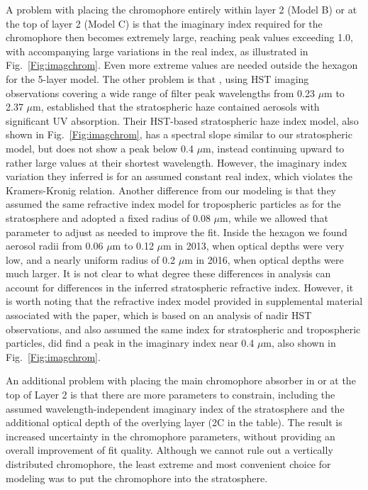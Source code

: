\documentclass[article,11pt]{emulateapj}
\def\mum{$\mu$m }
\def\mumx{$\mu$m}
\begin{document}
A problem with placing the chromophore entirely within layer 2 (Model B) or at the top of
layer 2 (Model C) is that the imaginary index required for the chromophore then becomes extremely large,
reaching peak values exceeding 1.0, with accompanying large variations in the real
index, as illustrated in Fig.\ \ref{Fig:imagchrom}. Even more extreme values are
needed outside the hexagon for the 5-layer model.  The other problem is that \cite{Kark2005}, using
HST imaging observations covering a wide range of filter peak wavelengths from 0.23 \mum to 2.37 \mumx, 
established that the 
stratospheric haze contained aerosols with significant UV absorption. Their HST-based
stratospheric haze index model, also shown in Fig.\ \ref{Fig:imagchrom}, has a
spectral slope similar to our stratospheric model, but does not show a peak below 0.4 \mumx,
instead continuing upward to rather large values at their shortest wavelength.
However, the imaginary index variation they inferred
is for an assumed constant real index, which violates the Kramers-Kronig relation.
Another difference from our modeling is that they assumed the same refractive
index model for tropospheric particles as for the stratosphere and adopted
a fixed radius of 0.08 \mumx, while we allowed that parameter to adjust as needed
to improve the fit.  Inside the hexagon we found aerosol radii from 0.06 \mum to 0.12 \mum in
2013, when optical depths were very low, and a nearly uniform radius of 0.2 \mum
in 2016, when optical depths were much larger.  It is not clear to what degree
these differences in analysis can account for differences in the inferred
stratospheric refractive index.  However, it is worth noting that the refractive index
model provided in supplemental material associated with the \cite{Sanchez-Lavega2020hazes}
paper, which is based on an analysis of nadir HST observations, and also assumed
the same index for stratospheric and tropospheric particles, did find a peak in
the imaginary index near 0.4 \mumx, also shown in Fig.\ \ref{Fig:imagchrom}.

An additional problem with placing the main chromophore absorber in or at the top
of Layer 2 is that there are more parameters to constrain, including the assumed wavelength-independent
 imaginary index of the stratosphere and the additional optical depth of the
overlying layer (2C in the table).  The result is increased uncertainty in
the chromophore parameters, without providing an overall improvement of fit
quality.  Although we cannot rule out a vertically distributed chromophore, the
least extreme and most convenient choice for modeling was to put the chromophore into
the stratosphere.
\end{document}
